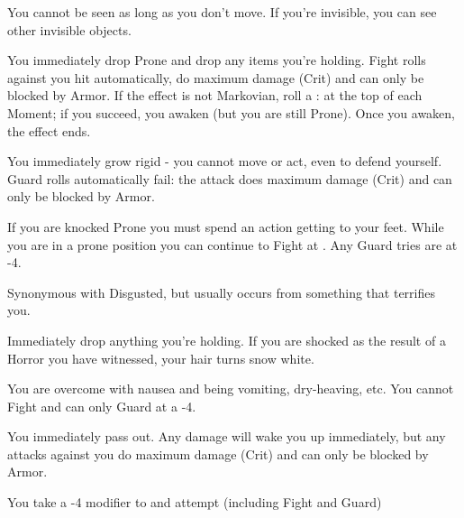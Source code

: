 {  

  You cannot be seen as long as you don't move.  If you're invisible, you can see other invisible objects.


  You immediately drop Prone and drop any items you're holding.  Fight rolls against you hit automatically, do maximum damage (Crit) and can only be blocked by Armor.  If the effect is not Markovian, roll a \RS : \VIG at the top of each Moment; if you succeed, you awaken (but you are still Prone).  Once you awaken, the effect ends.


  You immediately grow rigid - you cannot move or act, even to defend yourself.  Guard rolls automatically fail: the attack does maximum damage (Crit) and can only be blocked by Armor.  


  If you are knocked Prone you must spend an action getting to your feet.  While you are in a prone position you can continue to Fight at \DCDOWN. Any Guard \RO tries are at -4.


  Synonymous with Disgusted, but usually occurs from something that terrifies you.


  Immediately drop anything you're holding.  If you are shocked as the result of a Horror you have witnessed, your hair turns snow white.


  You are overcome with nausea and being vomiting, dry-heaving, etc.  You cannot Fight and can only Guard at a -4.


  You immediately pass out.  Any damage will wake you up immediately, but any attacks against you do maximum damage (Crit) and can only be blocked by Armor.


  You take a -4 modifier to  \RO  and \RB  attempt (including Fight and Guard)




}
